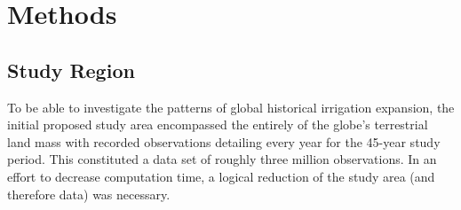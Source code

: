 \documentclass[12pt,twoside]{reedthesis}
\begin{document}
\hypertarget{methods}{%
\chapter{Methods}\label{methods}}

\hypertarget{studyreg}{%
\section{Study Region}\label{studyreg}}

To be able to investigate the patterns of global historical irrigation expansion, the initial proposed study area encompassed the entirely of the globe's terrestrial land mass with recorded observations detailing every year for the 45-year study period. This constituted a data set of roughly three million observations. In an effort to decrease computation time, a logical reduction of the study area (and therefore data) was necessary.
\end{document}
